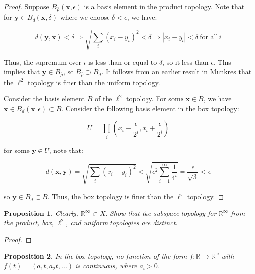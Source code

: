 \documentclass[10pt, oneside]{amsart}
\newtheorem{prop}{Proposition}
\newcommand{\bm}{\boldsymbol}
\begin{document}
    \begin{proof}
      Suppose $B_{\overline{\rho}}(\bm{x}, \epsilon)$ is a basis element in the product topology. Note that for $\bm{y} \in B_{d}(\bm{x}, \delta)$ where we choose $\delta < \epsilon$, we have:

      $$d(\bm{y}, \bm{x}) < \delta \Rightarrow \sqrt{\displaystyle\sum_{i} (x_i - y_i)^2 } < \delta \Rightarrow |x_i - y_i| < \delta \ \text{for all} \ i$$

      Thus, the supremum over $i$ is less than or equal to $\delta$, so it less than $\epsilon$. This implies that $\bm{y} \in B_{\overline{\rho}}$, so $B_{\overline{\rho}} \supset B_{d}$. It follows from an earlier
      result in Munkres that the $\ell^2$ topology is finer than the uniform topology.
      \newline

      Consider the basis element $B$ of the $\ell^2$ topology. For some $\bm{x} \in B$, we have $\bm{x} \in B_d(\bm{x}, \epsilon) \subset B$. Consider the following basis element in the box topology:

      $$U = \displaystyle\prod_{i} \left( x_i - \frac{\epsilon}{2^i}, x_i + \frac{\epsilon}{2^i} \right)$$

      for some $\bm{y} \in U$, note that:

      $$d(\bm{x}, \bm{y}) = \sqrt{\displaystyle\sum_{i} (x_i - y_i)^2} < \sqrt{\epsilon^2 \displaystyle\sum_{i = 1}^{\infty} \frac{1}{4^i}} = \frac{\epsilon}{\sqrt{3}} < \epsilon$$

      so $\bm{y} \in B_{d} \subset B$. Thus, the box topology is finer than the $\ell^2$ topology.
    \end{proof}

    \begin{prop}
      Clearly, $\mathbb{R}^{\infty} \subset X$. Show that the subspace topology for $\mathbb{R}^{\infty}$ from the product, box, $\ell^2$, and uniform topologies are distinct.
    \end{prop}

    \begin{proof}

    \end{proof}

    \begin{prop}
      In the box topology, no function of the form $f : \mathbb{R} \rightarrow \mathbb{R}^{\omega}$ with $f(t) = (a_1 t, a_2 t, ...)$ is continuous, where $a_i > 0$.
    \end{prop}
\end{document}
